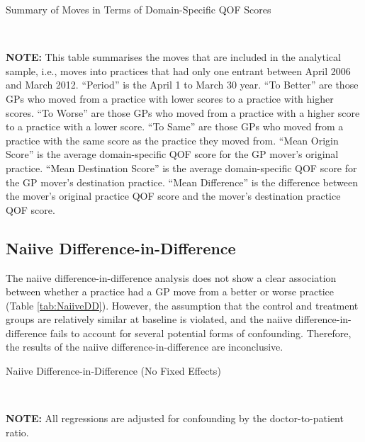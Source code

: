 \documentclass[11pt]{article}
\begin{document}
\begin{landscape}
  \begin{table}[ht]
  \caption{Summary of Moves in Terms of Domain-Specific QOF Scores}
    \begin{threeparttable}
    \\
    \begin{tablenotes}
    \footnotesize
    \textbf{NOTE:} This table summarises the moves that are included in the analytical sample, i.e., moves into practices that had only one entrant between April 2006 and March 2012. ``Period'' is the April 1 to March 30 year. ``To Better'' are those GPs who moved from a practice with lower scores to a practice with higher scores. ``To Worse'' are those GPs who moved from a practice with a higher score to a practice with a lower score. ``To Same'' are those GPs who moved from a practice with the same score as the practice they moved from. ``Mean Origin Score'' is the average domain-specific QOF score for the GP mover's original practice. ``Mean Destination Score'' is the average domain-specific QOF score for the GP mover's destination practice. ``Mean Difference'' is the difference between the mover's original practice QOF score and the mover's destination practice QOF score.
    \end{tablenotes}
    \end{threeparttable}
    \label{tab:movesummary}
  \end{table}
\end{landscape}


\subsection{Naiive Difference-in-Difference}

The naiive difference-in-difference analysis does not show a clear association between whether a practice had a GP move from a better or worse practice (Table \ref{tab:NaiiveDD}). However, the assumption that the control and treatment groups are relatively similar at baseline is violated, and the naiive difference-in-difference fails to account for several potential forms of confounding. Therefore, the results of the naiive difference-in-difference are inconclusive.


\begin{landscape}
  \begin{table}[htp]
  \caption{Naiive Difference-in-Difference (No Fixed Effects)}
    \begin{threeparttable}
    \\
    \begin{tablenotes}
    \footnotesize
    \textbf{NOTE:} All regressions are adjusted for confounding by the doctor-to-patient ratio.
    \end{tablenotes}
    \end{threeparttable}
    \label{tab:NaiiveDD}
  \end{table}
\end{landscape}
\end{document}
